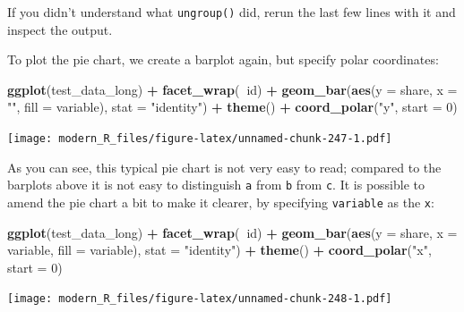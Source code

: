 \documentclass[]{gitbook}
\newenvironment{Shaded}{\begin{snugshade}}{\end{snugshade}}
\newcommand{\DataTypeTok}[1]{\textcolor[rgb]{0.13,0.29,0.53}{#1}}
\newcommand{\DecValTok}[1]{\textcolor[rgb]{0.00,0.00,0.81}{#1}}
\newcommand{\KeywordTok}[1]{\textcolor[rgb]{0.13,0.29,0.53}{\textbf{#1}}}
\newcommand{\NormalTok}[1]{#1}
\newcommand{\OperatorTok}[1]{\textcolor[rgb]{0.81,0.36,0.00}{\textbf{#1}}}
\newcommand{\StringTok}[1]{\textcolor[rgb]{0.31,0.60,0.02}{#1}}
\theoremstyle{definition}
\theoremstyle{definition}
\theoremstyle{definition}
\theoremstyle{remark}
\begin{document}
If you didn't understand what \texttt{ungroup()} did, rerun the last few
lines with it and inspect the output.

To plot the pie chart, we create a barplot again, but specify polar
coordinates:

\begin{Shaded}
\begin{Highlighting}[]
\KeywordTok{ggplot}\NormalTok{(test_data_long) }\OperatorTok{+}
\StringTok{  }\KeywordTok{facet_wrap}\NormalTok{(}\OperatorTok{~}\NormalTok{id) }\OperatorTok{+}
\StringTok{  }\KeywordTok{geom_bar}\NormalTok{(}\KeywordTok{aes}\NormalTok{(}\DataTypeTok{y =}\NormalTok{ share, }\DataTypeTok{x =} \StringTok{""}\NormalTok{, }\DataTypeTok{fill =}\NormalTok{ variable), }\DataTypeTok{stat =} \StringTok{"identity"}\NormalTok{) }\OperatorTok{+}
\StringTok{  }\KeywordTok{theme}\NormalTok{() }\OperatorTok{+}
\StringTok{  }\KeywordTok{coord_polar}\NormalTok{(}\StringTok{"y"}\NormalTok{, }\DataTypeTok{start =} \DecValTok{0}\NormalTok{)}
\end{Highlighting}
\end{Shaded}

\texttt{[image: modern\_R\_files/figure-latex/unnamed-chunk-247-1.pdf]}

As you can see, this typical pie chart is not very easy to read;
compared to the barplots above it is not easy to distinguish \texttt{a}
from \texttt{b} from \texttt{c}. It is possible to amend the pie chart a
bit to make it clearer, by specifying \texttt{variable} as the
\texttt{x}:

\begin{Shaded}
\begin{Highlighting}[]
\KeywordTok{ggplot}\NormalTok{(test_data_long) }\OperatorTok{+}
\StringTok{  }\KeywordTok{facet_wrap}\NormalTok{(}\OperatorTok{~}\NormalTok{id) }\OperatorTok{+}
\StringTok{  }\KeywordTok{geom_bar}\NormalTok{(}\KeywordTok{aes}\NormalTok{(}\DataTypeTok{y =}\NormalTok{ share, }\DataTypeTok{x =}\NormalTok{ variable, }\DataTypeTok{fill =}\NormalTok{ variable), }\DataTypeTok{stat =} \StringTok{"identity"}\NormalTok{) }\OperatorTok{+}
\StringTok{  }\KeywordTok{theme}\NormalTok{() }\OperatorTok{+}
\StringTok{  }\KeywordTok{coord_polar}\NormalTok{(}\StringTok{"x"}\NormalTok{, }\DataTypeTok{start =} \DecValTok{0}\NormalTok{)}
\end{Highlighting}
\end{Shaded}

\texttt{[image: modern\_R\_files/figure-latex/unnamed-chunk-248-1.pdf]}
\end{document}
